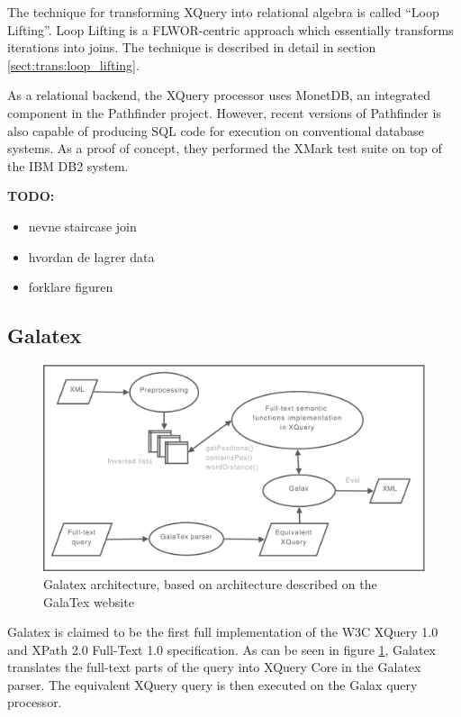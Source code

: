 The technique for transforming XQuery into relational algebra is called ``Loop
Lifting''\cite{pathfinder_mothertongue}. Loop Lifting is a FLWOR-centric
approach which essentially transforms iterations into joins. The technique is
described in detail in section \ref{sect:trans:loop_lifting}.

As a relational backend, the XQuery processor uses MonetDB, an integrated
component in the Pathfinder project. However, recent versions of Pathfinder is
also capable of producing SQL code for execution on conventional database
systems. As a proof of concept, they performed the XMark test suite on top of
the IBM DB2 system\cite{pathfinder_sql}.

\textbf{\Large TODO:}
\begin{itemize}
  \item nevne staircase join
  \item hvordan de lagrer data
  \item forklare figuren
\end{itemize}

\subsection{Galatex}
\begin{figure}[h]
  \centering
    \includegraphics[width=1\textwidth]{diagrams/galatex_arch}
  \caption[GalaTex architecture]{Galatex architecture, based on architecture described on
  the GalaTex website\cite{galatex}}
  \label{figure:galatex:arch}
\end{figure}
Galatex is claimed to be the first full implementation of the W3C XQuery 1.0 
and XPath 2.0 Full-Text 1.0 specification\cite{w3c01}. As can be seen in figure
\ref{figure:galatex:arch}, Galatex translates the full-text parts of the query
into XQuery Core\cite{xquery_semantics} in the Galatex parser. The equivalent
XQuery query is then executed on the Galax query processor.

